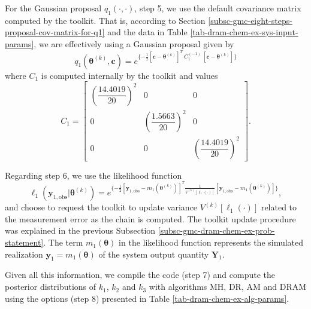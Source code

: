 For the Gaussian proposal $q_1(\cdot,\cdot)$, step 5,
we use the default covariance matrix computed by the toolkit.
That is, according to Section \ref{subsc-gmc-eight-steps-proposal-cov-matrix-for-q1}
and the data in Table \ref{tab-dram-chem-ex-sys-input-params}, we are effectively using a Gaussian proposal given by
\begin{equation*}
q_1(\boldsymbol{\theta}^{(k)},\mathbf{c}) = e^
{
\{
-\frac{1}{2}
[\mathbf{c}-\boldsymbol{\theta}^{(k)}]^T
~C_1^{(-1)}~
[\mathbf{c}-\boldsymbol{\theta}^{(k)}]
\}
}
\end{equation*}
where $C_1$ is computed internally by the toolkit and values
\begin{equation*}
C_1 =
\left[
\begin{array}{ccc}
\left(\dfrac{14.4019}{20}\right)^2 & 0                                 &                                  0 \\
                                 0 & \left(\dfrac{1.5663}{20}\right)^2 &                                  0 \\
                                 0 &                                 0 & \left(\dfrac{14.4019}{20}\right)^2
\end{array}
\right].
\end{equation*}

Regarding step 6,
we use the likelihood function
\begin{equation*}
\ell_1(\mathbf{y}_{1,\text{obs}}|\boldsymbol{\theta}^{(k)}) = e^
{
\{
-\frac{1}{2}
[\mathbf{y}_{1,\text{obs}}-m_1(\boldsymbol{\theta}^{(k)})]^T
\frac{1}{V^{(k)}[\ell_1(\cdot)]}
[\mathbf{y}_{1,\text{obs}}-m_1(\boldsymbol{\theta}^{(k)})]
\}
},
\end{equation*}
and choose to request the toolkit to update variance $V^{(k)}[\ell_1(\cdot)]$ related to the measurement error as the chain is computed.
The toolkit update procedure 
was explained in the previous Subsection \ref{subsc-gmc-dram-chem-ex-prob-statement}.
The term $m_1(\boldsymbol{\theta})$ in the likelihood function represents the simulated realization $\mathbf{y}_1=m_1(\boldsymbol{\theta})$ of the system output quantity $\mathbf{Y}_1$.

Given all this information,
we compile the code (step 7) and
compute the posterior distributions of $k_1$, $k_2$ and $k_3$ with algorithms MH, DR, AM and DRAM using the options (step 8)
presented in Table \ref{tab-dram-chem-ex-alg-params}.

